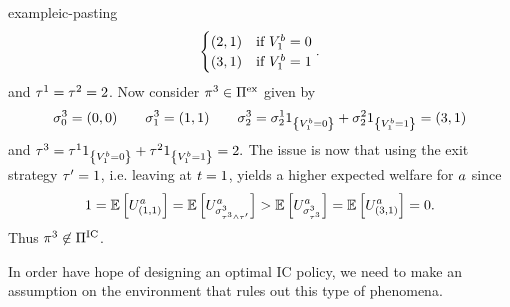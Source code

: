 \begin{restatable}{example}{ic-pasting}
\begin{align*}
\begin{cases}
            (2,1)
            &
            \text{if } V^b_{1}=0
            \\
            (3,1)
            &
            \text{if } V^b_{1}=1
        \end{cases}  .
    \end{align*}  
    and $\tau^1=\tau^2=2$.
    Now consider 
    \(
        \pi^3\in\Pi^{\text{ex}}
    \)
    given by
    \[
        \sigma_{0}^3
        = 
        (0,0)
        \qquad
        \sigma_{1}^3
        = (1,1)
        \qquad
        \sigma_{2}^3
        =
        \sigma_{2}^1
        1_{
            \left\{
                V^b_{1}= 0
            \right\}
        }
        +
        \sigma_{2}^2
        1_{
            \left\{
                V^b_{1}= 1
            \right\}
        }
        =
        (3,1)
    \]
    and 
    \(
        \tau^3
        =
        \tau^1
        1_{
            \left\{
                V^b_{1}= 0
            \right\}
        }
        +
        \tau^2
        1_{
            \left\{
                V^b_{1}= 1
            \right\}
        }
        = 2.
    \)
    The issue is now that using the exit strategy $\tau'=1$, i.e. leaving at $t=1$, yields
    a higher expected welfare for $a$ since
    \[
        1
        =
        \mathbb{E}\left[
            U^a_{
                (1,1)
            }
        \right]
        =
        \mathbb{E}\left[
            U^a_{
                \sigma_{
                    \tau^3\wedge\tau'
                }^3
            }
        \right]
        >
        \mathbb{E}\left[
            U^a_{
                \sigma_{
                    \tau^3
                }^3
            }
        \right]
        =
        \mathbb{E}\left[
            U^a_{
                (3,1)
            }
        \right]
        =0 .
    \]
    Thus $\pi^3\not\in\Pi^{\text{IC}}$.
\end{restatable}  



In order have hope of designing an optimal IC policy, we need to make an assumption on the environment
that rules out this type of phenomena.

